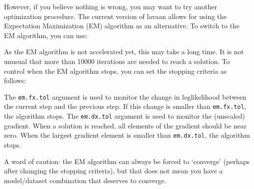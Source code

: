 However, if you believe nothing is wrong, you may want to try another
optimization procedure. The current version of lavaan allows for using
the Expectation Maximization (EM) algorithm as an alternative. To switch
to the EM algorithm, you can use:

\begin{Shaded}
\begin{Highlighting}[]
\StringTok{ }\NormalTok{(} \NormalTok{,}
                \NormalTok{, } \NormalTok{)}
\end{Highlighting}
\end{Shaded}

As the EM algorithm is not accelerated yet, this may take a long time.
It is not unusual that more than 10000 iterations are needed to reach a
solution. To control when the EM algorithm stops, you can set the
stopping criteria as follows:

\begin{Shaded}
\begin{Highlighting}[]
\StringTok{ }\NormalTok{(} \NormalTok{,}
                \NormalTok{, } \NormalTok{, } \NormalTok{,}
                \NormalTok{, } \NormalTok{)}
\end{Highlighting}
\end{Shaded}

The \texttt{em.fx.tol} argument is used to monitor the change in
loglikelihood between the current step and the previous step. If this
change is smaller than \texttt{em.fx.tol}, the algorithm stops. The
\texttt{em.dx.tol} argument is used to monitor the (unscaled) gradient.
When a solution is reached, all elements of the gradient should be near
zero. When the largest gradient element is smaller than
\texttt{em.dx.tol}, the algorithm stops.

A word of caution: the EM algorithm can always be forced to `converge'
(perhaps after changing the stopping criteria), but that does not mean
you have a model/dataset combination that deserves to converge.
